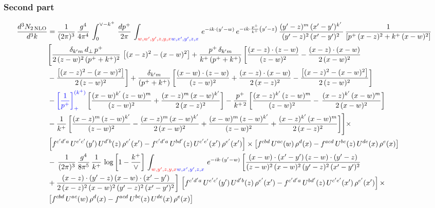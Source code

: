 \documentclass[9pt]{article}
\newcommand{\new}[1]{{\color{blue}#1}}
\newcommand{\old}[1]{{\color{red}#1}}
\numberwithin{equation}{section}
\begin{document}
\subsubsection{Second part}
\begin{align}
 \frac{d^{3}N_{2\,\rm NLO}}{d^{3}k} & = \frac{1}{(2\pi)^{3}}\,\frac{g^{4}}{4\pi^{4}}\,\int_{0}^{\vee-k^{+}}\, \frac{dp^{+}}{2\pi}\,\int_{\old{w,w',y',z,y,x}\new{w,x',y',z,x}}\, e^{-ik\cdot (y'-w)}\,e^{-ik\cdot \frac{p^{+}}{k^{+}}\left(y'-z\right)}\, \frac{(y'-z)^{m}\,(x'-y')^{k'}\,}{(y'-z)^{2}\,(x'-y')^{2}\,}\, \frac{1}{\left[p^{+}\,(x-z)^{2}+k^{+}\,(x-w)^{2}\right]}\notag \\ & \Bigg[\frac{\delta_{k'm}\,d_{\perp}\,p^{+}}{2\,(z-w)^{2}\,(p^{+}+k^{+})^{2}}\, \left[(x-z)^{2}-(x-w)^{2}\right]+\frac{p^{+}\,\delta_{k'm}}{k^{+}\,(p^{+}+k^{+})}\,\bigg[\frac{(x-z)\cdot (z-w)}{(z-w)^{2}} -\frac{(x-z)\cdot (x-w)}{2\,(x-w)^{2}}\notag \\ & -\frac{\left[(x-z)^{2}-(x-w)^{2}\right]}{2\,(z-w)^{2}}\bigg] +\frac{\delta_{k'm}}{(p^{+}+k^{+})}\,\bigg[\frac{(x-w)\cdot (z-w)}{(z-w)^{2}}+\frac{(x-z)\cdot (x-w)}{2\,(x-z)^{2}} -\frac{\left[(x-z)^{2}-(x-w)^{2}\right]}{2\,(z-w)^{2}}\bigg]\notag \\ & -\new{\left[\frac{1}{p^{+}}\right]_{+}^{(k^{+})}}\,\bigg[\frac{(x-w)^{k'}\,(z-w)^{m}}{(z-w)^{2}}+\frac{(x-z)^{m}\,(x-w)^{k'}}{2\,(x-z)^{2}}\bigg]-\frac{p^{+}}{k^{+\,2}}\,\bigg[\frac{(x-z)^{k'}\,(z-w)^{m}}{(z-w)^{2}} -\,\frac{(x-z)^{k'}\,(x-w)^{m}}{2\,(x-w)^{2}}\bigg]\notag \\ & -\frac{1}{k^{+}}\,\bigg[\frac{(x-z)^{m}\,(z-w)^{k'}}{(z-w)^{2}}-\frac{(x-z)^{m}\,(x-w)^{k'}}{2\,(x-w)^{2}}+\frac{(x-w)^{m}\,(z-w)^{k'}}{(z-w)^{2}} +\frac{(x-z)^{k'}\,(x-w)^{m}}{2\,(x-z)^{2}}\bigg]\Bigg]\times\,\notag \\ & \left[f^{c'd'a}\,U^{e'c'}(y')\,U^{d'b}(z)\,\rho^{e'}(x')-f^{c'd'a}\, 
    U^{bd'}(z)\,U^{c'e'}(x')\,\rho^{e'}(x')\right]\times \left[f^{cbd}\,U^{ac}(w)\,\rho^{d}(x) -f^{acd}\,U^{bc}(z)\,U^{de}(x)\,\rho^{e}(x)\right]\notag \\ &  -\, \frac{1}{(2\pi)^{3}}\,\frac{g^{4}}{8\pi^{5}}\,\frac{1}{k^{+}}\,\log{\left[1-\frac{k^{+}}{\vee}\right]}\,\int_{\old{w,y',z,y,x}\new{w,x',y',z,x}}\, e^{-ik\cdot (y'-w)}\,\bigg[\frac{(x-w)\cdot (x'-y')\,(z-w)\cdot (y'-z)}{(z-w)^{2}\,(x-w)^{2}\,(y'-z)^{2}\,(x'-y')^{2}}\notag \\ & +\frac{(x-z)\cdot (y'-z)\,(x-w)\cdot (x'-y')}{2\,(x-z)^{2}\,(x-w)^{2}\,(y'-z)^{2}\,(x'-y')^{2}}\bigg]\, \left[f^{c'd'a}\,U^{e'c'}(y')\,U^{d'b}(z)\,\rho^{e'}(x')-f^{c'd'a}\, 
    U^{bd'}(z)\,U^{c'e'}(x')\,\rho^{e'}(x')\right]\times\notag \\ &  \left[f^{cbd}\,U^{ac}(w)\,\rho^{d}(x) -f^{acd}\,U^{bc}(z)\,U^{de}(x)\,\rho^{e}(x)\right] 

\end{align}
\end{document}
